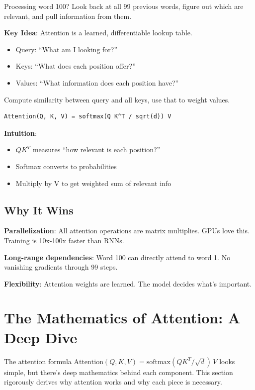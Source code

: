 Processing word 100? Look back at all 99 previous words, figure out which are relevant, and pull information from them.

\textbf{Key Idea}: Attention is a learned, differentiable lookup table.

\begin{itemize}
\item Query: ``What am I looking for?''
\item Keys: ``What does each position offer?''
\item Values: ``What information does each position have?''
\end{itemize}

Compute similarity between query and all keys, use that to weight values.

\begin{verbatim}
Attention(Q, K, V) = softmax(Q K^T / sqrt(d)) V
\end{verbatim}

\textbf{Intuition}:
\begin{itemize}
\item $QK^T$ measures ``how relevant is each position?''
\item Softmax converts to probabilities
\item Multiply by V to get weighted sum of relevant info
\end{itemize}

\subsection{Why It Wins}

\textbf{Parallelization}: All attention operations are matrix multiplies. GPUs love this. Training is 10x-100x faster than RNNs.

\textbf{Long-range dependencies}: Word 100 can directly attend to word 1. No vanishing gradients through 99 steps.

\textbf{Flexibility}: Attention weights are learned. The model decides what's important.

\section{The Mathematics of Attention: A Deep Dive}

The attention formula $\text{Attention}(Q, K, V) = \text{softmax}(QK^T / \sqrt{d})\, V$ looks simple, but there's deep mathematics behind each component. This section rigorously derives why attention works and why each piece is necessary.

